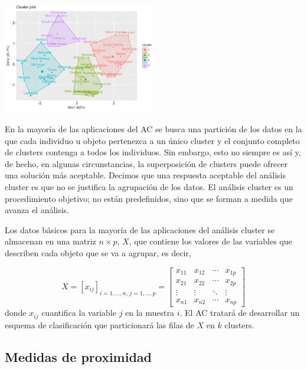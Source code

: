 \begin{center}
    \includegraphics[width=0.5\textwidth]{../img/cluster-1.png}
\end{center}

En la mayoría de las aplicaciones del AC se busca una partición de los datos en la que cada individuo u objeto pertenezca a un único cluster y el conjunto completo de clusters
contenga a todos los individuos. Sin embargo, esto no siempre es así y, de hecho, en algunas circunstancias, la superposición de clusters puede ofrecer una solución más aceptable.
Decimos que una respuesta aceptable del análisis cluster es que no se justifica la agrupación de los datos. El análisis cluster es un procedimiento objetivo; no están predefinidos,
sino que se forman a medida que avanza el análisis. \newline

Los datos básicos para la mayoría de las aplicaciones del análisis cluster se almacenan en una matriz $n \times p$, $X$, que contiene los valores de las variables que describen
cada objeto que se va a agrupar, es decir,

\[
X = [x_{ij}]_{i=1,\dots,n,\, j=1,\dots,p} =
\begin{bmatrix}
x_{11} & x_{12} & \cdots & x_{1p} \\
x_{21} & x_{22} & \cdots & x_{2p} \\
\vdots & \vdots & \ddots & \vdots \\
x_{n1} & x_{n2} & \cdots & x_{np}
\end{bmatrix}
\]
donde $x_{ij}$ cuantifica la variable $j$ en la muestra $i$. El AC tratará de desarrollar un esquema de clasificación que particionará las filas de $X$ en $k$ clusters\cite{clustering-2}. %


\subsection{Medidas de proximidad}

